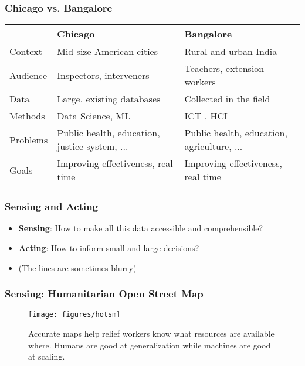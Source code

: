 \documentclass[10pt,mathserif]{beamer}
\begin{document}
\begin{frame}
  \frametitle{Chicago vs. Bangalore}
  \begin{table}[]
   \begin{tabular}{|p{2cm}|p{4cm}|p{4cm}|}
     \hline
            & \textbf{Chicago}                                 & \textbf{Bangalore}                              \\\hline
    Context  & Mid-size American cities                      & Rural and urban India                      \\\hline
    Audience & Inspectors, interveners                       & Teachers, extension workers                \\\hline
    Data     & Large, existing databases                     & Collected in the field                     \\\hline
    Methods  & Data Science, ML & ICT , HCI \\\hline
    Problems & Public health, education, justice system, ... & Public health, education, agriculture, ...\\\hline
    Goals & Improving effectiveness, real time & Improving effectiveness, real time  \\\hline
    \end{tabular}
    \end{table}
    \end{frame}

\begin{frame}
  \frametitle{Sensing and Acting}
  \begin{itemize}
  \item \textbf{Sensing}: How to make all this data accessible and comprehensible?
  \item \textbf{Acting}: How to inform small and large decisions?
  \item (The lines are sometimes blurry)
  \end{itemize}
\end{frame}

\begin{frame}
  \frametitle{Sensing: Humanitarian Open Street Map}
  \begin{figure}[ht]
    \centering
    \texttt{[image: figures/hotsm]}
    \caption{Accurate maps help relief workers know what resources are available
      where. Humans are good at generalization while machines are good at
      scaling. \label{fig:hotsm} }
  \end{figure}
\end{frame}
\end{document}
